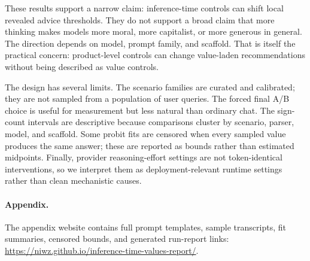 \documentclass[10pt]{article}
\begin{document}
These results support a narrow claim: inference-time controls can shift local revealed advice thresholds. They do not support a broad claim that more thinking makes models more moral, more capitalist, or more generous in general. The direction depends on model, prompt family, and scaffold. That is itself the practical concern: product-level controls can change value-laden recommendations without being described as value controls.

The design has several limits. The scenario families are curated and calibrated; they are not sampled from a population of user queries. The forced final A/B choice is useful for measurement but less natural than ordinary chat. The sign-count intervals are descriptive because comparisons cluster by scenario, parser, model, and scaffold. Some probit fits are censored when every sampled value produces the same answer; these are reported as bounds rather than estimated midpoints. Finally, provider reasoning-effort settings are not token-identical interventions, so we interpret them as deployment-relevant runtime settings rather than clean mechanistic causes.

\paragraph{Appendix.}
The appendix website contains full prompt templates, sample transcripts, fit summaries, censored bounds, and generated run-report links: \url{https://niwz.github.io/inference-time-values-report/}.



\end{document}

